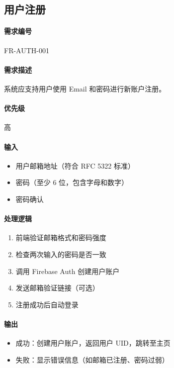\subsection{用户注册}

\paragraph{需求编号} FR-AUTH-001

\paragraph{需求描述} 系统应支持用户使用 Email 和密码进行新账户注册。

\paragraph{优先级} 高

\paragraph{输入}
\begin{itemize}
    \item 用户邮箱地址（符合 RFC 5322 标准）
    \item 密码（至少 6 位，包含字母和数字）
    \item 密码确认
\end{itemize}

\paragraph{处理逻辑}
\begin{enumerate}
    \item 前端验证邮箱格式和密码强度
    \item 检查两次输入的密码是否一致
    \item 调用 Firebase Auth 创建用户账户
    \item 发送邮箱验证链接（可选）
    \item 注册成功后自动登录
\end{enumerate}

\paragraph{输出}
\begin{itemize}
    \item 成功：创建用户账户，返回用户 UID，跳转至主页
    \item 失败：显示错误信息（如邮箱已注册、密码过弱）
\end{itemize}

